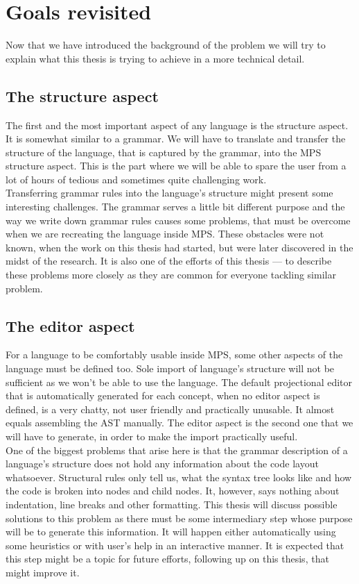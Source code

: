 \chapter{Goals revisited}

Now that we have introduced the background of the problem we will try to explain what this thesis is trying to achieve in a more technical detail.

\section{The structure aspect}
The first and the most important aspect of any language is the structure aspect. It is somewhat similar to a grammar. We will have to translate and transfer the structure of the language, that is captured by the grammar, into the MPS structure aspect. This is the part where we will be able to spare the user from a lot of hours of tedious and sometimes quite challenging work.
\\

Transferring grammar rules into the language's structure might present some interesting challenges. The grammar serves a little bit different purpose and the way we write down grammar rules causes some problems, that must be overcome when we are recreating the language inside MPS. These obstacles were not known, when the work on this thesis had started, but were later discovered in the midst of the research. It is also one of the efforts of this thesis --- to describe these problems more closely as they are common for everyone tackling similar problem.

\section{The editor aspect}
For a language to be comfortably usable inside MPS, some other aspects of the language must be defined too. Sole import of language's structure will not be sufficient as we won't be able to use the language. The default projectional editor that is automatically generated for each concept, when no editor aspect is defined, is a very chatty, not user friendly and practically unusable. It almost equals assembling the AST manually. The editor aspect is the second one that we will have to generate, in order to make the import practically useful.
\\

One of the biggest problems that arise here is that the grammar description of a language's structure does not hold any information about the code layout whatsoever. Structural rules only tell us, what the syntax tree looks like and how the code is broken into nodes and child nodes. It, however, says nothing about indentation, line breaks and other formatting. This thesis will discuss possible solutions to this problem as there must be some intermediary step whose purpose will be to generate this information. It will happen either automatically using some heuristics or with user's help in an interactive manner. It is expected that this step might be a topic for future efforts, following up on this thesis, that might improve it.

